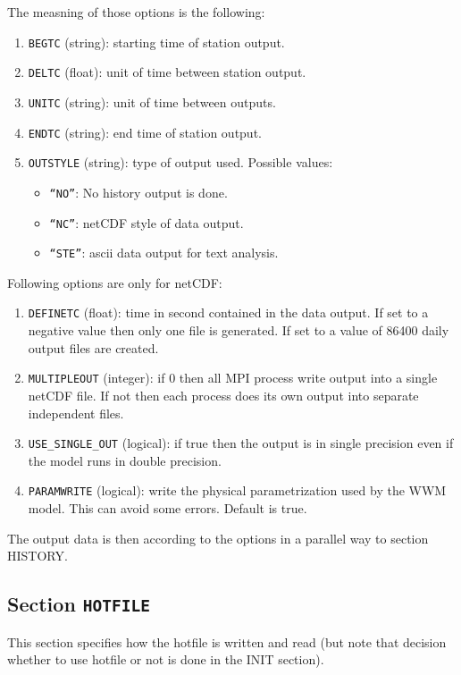 \documentclass[12pt]{amsart}
\begin{document}
The measning of those options is the following:
\begin{enumerate}
\item {\tt BEGTC} (string): starting time of station output.
\item {\tt DELTC} (float): unit of time between station output.
\item {\tt UNITC} (string): unit of time between outputs.
\item {\tt ENDTC} (string): end time of station output.
\item {\tt OUTSTYLE} (string): type of output used. Possible values:
  \begin{itemize}
  \item {\tt ``NO''}: No history output is done.
  \item {\tt ``NC''}: netCDF style of data output.
  \item {\tt ``STE''}: ascii data output for text analysis.
  \end{itemize}
\end{enumerate}
Following options are only for netCDF:
\begin{enumerate}
\item {\tt DEFINETC} (float): time in second contained in the data output.
If set to a negative value then only one file is generated.
If set to a value of 86400 daily output files are created.
\item {\tt MULTIPLEOUT} (integer): if 0 then all MPI process write output into a single netCDF file. If not then each process does its own output into separate independent files.
\item {\tt USE\_SINGLE\_OUT} (logical): if true then the output is in single precision even if the model runs in double precision.
\item {\tt PARAMWRITE} (logical): write the physical parametrization used by the WWM model. This can avoid some errors. Default is true.
\end{enumerate}
The output data is then according to the options in a parallel way to section HISTORY.



\subsection{Section {\tt HOTFILE}}
This section specifies how the hotfile is written and read (but note that decision whether to use hotfile or not is done in the INIT section).
\end{document}
